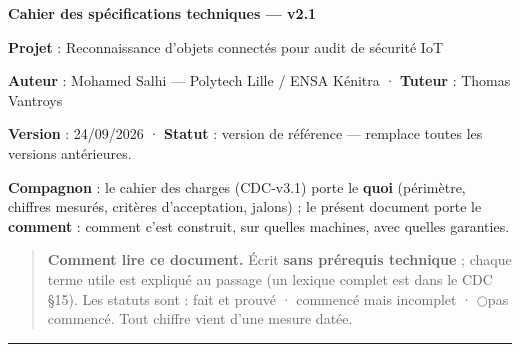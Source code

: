 \documentclass[11pt,a4paper]{article}
\newcommand{\fait}{\textcolor{green!45!black}{\ding{51}}}      %
\newcommand{\encours}{\textcolor{blue!65!black}{\ding{46}}}   %
\newcommand{\afaire}{\textcolor{orange!85!black}{$\bigcirc$}}  %
\begin{document}
\begin{center}{\LARGE\bfseries Cahier des spécifications techniques — v2.1\par}\end{center}\vspace{4pt}
\begin{flushleft}\textbf{Projet} : Reconnaissance d'objets connectés pour audit de sécurité IoT\end{flushleft}

\begin{flushleft}\textbf{Auteur} : Mohamed Salhi — Polytech Lille / ENSA Kénitra · \textbf{Tuteur} : Thomas Vantroys\end{flushleft}

\begin{flushleft}\textbf{Version} : 24/09/2026 · \textbf{Statut} : version de référence — remplace toutes les versions antérieures.\end{flushleft}

\textbf{Compagnon} : le cahier des charges (CDC-v3.1) porte le \textbf{quoi} (périmètre, chiffres mesurés, critères d'acceptation, jalons) ; le présent document porte le \textbf{comment} : comment c'est construit, sur quelles machines, avec quelles garanties.

\begin{quote}\small \textbf{Comment lire ce document.} Écrit \textbf{sans prérequis technique} ; chaque terme utile est expliqué au passage (un lexique complet est dans le CDC §15). Les statuts sont : \fait fait et prouvé · \encours commencé mais incomplet · \afaire pas commencé. Tout chiffre vient d'une mesure datée.\end{quote}
\medskip\hrule\medskip
\end{document}
